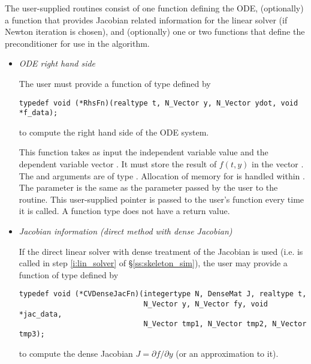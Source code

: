 The user-supplied routines consist of one function defining the ODE, 
(optionally) a function that provides Jacobian related information for the linear 
solver (if Newton iteration is chosen), and (optionally) one or two functions 
that define the preconditioner for use in the {\spgmr} algorithm. 

\begin{itemize}
%
%
\item {\em ODE right hand side}

  The user must provide a function of type  defined by
\begin{verbatim}
typedef void (*RhsFn)(realtype t, N_Vector y, N_Vector ydot, void *f_data);
\end{verbatim}
  to compute the right hand side of the ODE system.
  
  This function takes as input the independent variable  
  value  and the dependent variable vector .  It must store the    
  result of $f(t,y)$ in the vector .  The  and  arguments 
  are of type . Allocation of memory for  is handled within {\cvodes}.
  The  parameter is the same as the  parameter passed by 
  the user to the  routine. This user-supplied pointer is passed to 
  the user's  function every time it is called.                                       
  A  function type does not have a return value.                        
%
%
\item {\em Jacobian information (direct method with dense Jacobian)}
  \label{p:djac}
  
  If the direct linear solver with dense treatment of the Jacobian is used 
  (i.e.  is called in step \ref{i:lin_solver} of \S\ref{ss:skeleton_sim}), 
  the user may provide a function of type  defined by
\begin{verbatim}
typedef void (*CVDenseJacFn)(integertype N, DenseMat J, realtype t, 
                             N_Vector y, N_Vector fy, void *jac_data,
                             N_Vector tmp1, N_Vector tmp2, N_Vector tmp3);
\end{verbatim}
  to compute the dense Jacobian $J = \partial f / \partial y$ (or an approximation to it).
  

\end{itemize}

